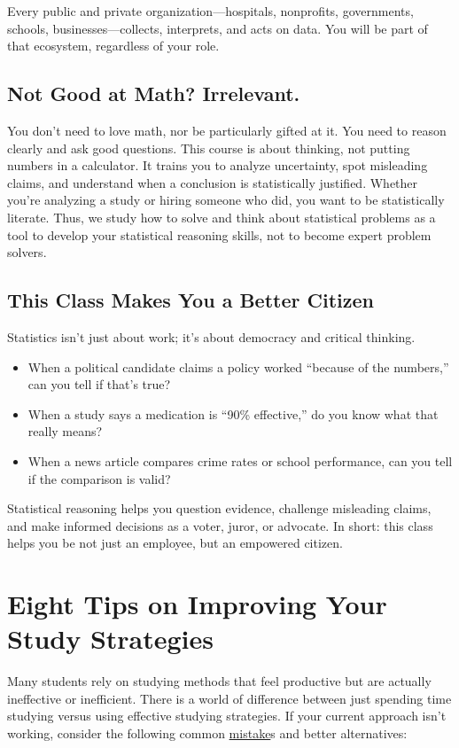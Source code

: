 \documentclass[12pt]{article}
\begin{document}
Every public and private organization—hospitals, nonprofits, governments, schools, businesses—collects, interprets, and acts on data. You will be part of that ecosystem, regardless of your role.

\subsection*{Not Good at Math? Irrelevant.}

You don’t need to love math, nor be particularly gifted at it. You need to reason clearly and ask good questions. This course is about thinking, not putting numbers in a calculator. It trains you to analyze uncertainty, spot misleading claims, and understand when a conclusion is statistically justified. Whether you're analyzing a study or hiring someone who did, you want to be statistically literate. Thus, we study how to solve and think about statistical problems as a tool to develop your statistical reasoning skills, not to become expert problem solvers.

\subsection*{This Class Makes You a Better Citizen}

Statistics isn’t just about work; it’s about democracy and critical thinking.
\begin{itemize}
    \item When a political candidate claims a policy worked ``because of the numbers,” can you tell if that’s true?
    \item When a study says a medication is ``90\% effective,” do you know what that really means?
    \item When a news article compares crime rates or school performance, can you tell if the comparison is valid?
\end{itemize}

Statistical reasoning helps you question evidence, challenge misleading claims, and make informed decisions as a voter, juror, or advocate. In short: this class helps you be not just an employee, but an empowered citizen.

\section*{Eight Tips on Improving Your Study Strategies}

Many students rely on studying methods that feel productive but are actually ineffective or inefficient. There is a world of difference between just spending time studying versus using effective studying strategies. If your current approach isn’t working, consider the following common \underline{mistake}s and better alternatives:
\end{document}

